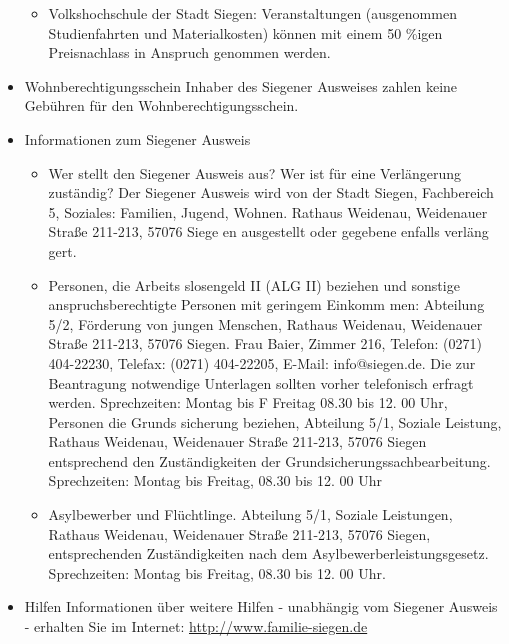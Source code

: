\begin{itemize}
\begin{itemize}
		\item Volkshochschule der Stadt Siegen: Veranstaltungen (ausgenommen Studienfahrten und Materialkosten) können mit einem 50 \%igen Preisnachlass in Anspruch genommen werden.
	\end{itemize}
	\item Wohnberechtigungsschein Inhaber des Siegener Ausweises zahlen keine Gebühren für den Wohnberechtigungsschein.
	\item Informationen zum Siegener Ausweis
	\begin{itemize}
		\item Wer stellt den Siegener Ausweis aus? Wer ist für eine Verlängerung zuständig?	Der Siegener Ausweis wird von der 
		Stadt Siegen, Fachbereich 5, Soziales: Familien, Jugend, Wohnen. Rathaus Weidenau, Weidenauer Straße 211-213,  57076 Siege en ausgestellt oder gegebene enfalls verläng gert.  
		\item Personen, die Arbeits slosengeld II (ALG II) beziehen und sonstige anspruchsberechtigte Personen mit geringem Einkomm
		men: Abteilung 5/2, Förderung von jungen Menschen, Rathaus Weidenau, Weidenauer Straße 211-213, 57076 Siegen. Frau Baier, Zimmer 216, Telefon: (0271) 404-22230, Telefax: (0271) 404-22205, E-Mail: info@siegen.de. Die zur Beantragung notwendige Unterlagen sollten vorher telefonisch erfragt werden. Sprechzeiten: Montag bis F Freitag 08.30 bis 12. 00 Uhr, Personen  die Grunds sicherung beziehen,  Abteilung 5/1, Soziale Leistung, Rathaus Weidenau, Weidenauer Straße 211-213, 57076 Siegen  
		entsprechend den Zuständigkeiten der Grundsicherungssachbearbeitung. Sprechzeiten: Montag bis Freitag, 08.30 bis 12. 00 Uhr 
		\item Asylbewerber und Flüchtlinge. Abteilung 5/1, Soziale Leistungen, Rathaus Weidenau, Weidenauer Straße 211-213,	57076 Siegen, entsprechenden Zuständigkeiten nach dem Asylbewerberleistungsgesetz. Sprechzeiten: Montag bis Freitag, 08.30 bis 12. 00 Uhr.
	\end{itemize}
	\item Hilfen Informationen über weitere Hilfen - unabhängig vom Siegener Ausweis - erhalten Sie im Internet: \href{http://www.familie-siegen.de}{http://www.familie-siegen.de}
\end{itemize}
